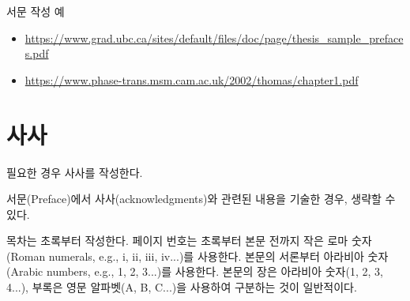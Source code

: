 \documentclass[11pt]{report}
\numberwithin{figure}{chapter}
\begin{document}
\bigskip
서문 작성 예
\begin{itemize}
\item\url{https://www.grad.ubc.ca/sites/default/files/doc/page/thesis_sample_prefaces.pdf}
\item\url{https://www.phase-trans.msm.cam.ac.uk/2002/thomas/chapter1.pdf}
\end{itemize}

\newpage
{}
\chapter*{사사}

\normalsize
필요한 경우 사사를 작성한다. \par
서문(Preface)에서 사사(acknowledgments)와 관련된 내용을 기술한 경우, 생략할 수 있다.

\newpage
\renewcommand*\contentsname{목차}
\tableofcontents


\vspace{2cm}

목차는 초록부터 작성한다.
페이지 번호는 초록부터 본문 전까지 작은 로마 숫자(Roman numerals, e.g., i, ii, iii, iv...)를 사용한다. 본문의 서론부터 아라비아 숫자(Arabic numbers, e.g., 1, 2, 3...)를 사용한다. 
본문의 장은 아라비아 숫자(1, 2, 3, 4...), 부록은 영문 알파벳(A, B, C...)을 사용하여 구분하는 것이 일반적이다.

\renewcommand{\listtablename}{표 목차}
\listoftables


\renewcommand{\listfigurename}{그림 목차}
\listoffigures

\end{document}

